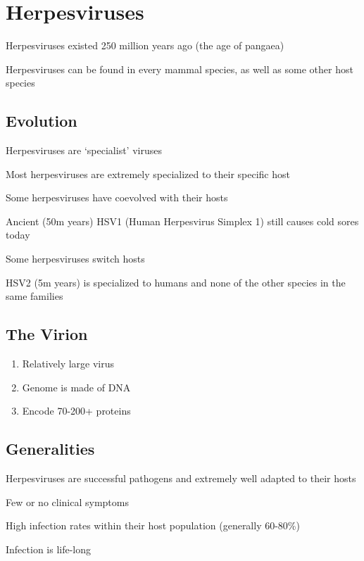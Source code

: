 \documentclass{notes}
\begin{document}
\section{Herpesviruses}

Herpesviruses existed 250 million years ago (the age of pangaea)

Herpesviruses can be found in every mammal species, as well as some other host species


\subsection{Evolution}

Herpesviruses are `specialist' viruses

\tab Most herpesviruses are extremely specialized to their specific host

Some herpesviruses have coevolved with their hosts

\tab \indicates Ancient (50m years) HSV1 (Human Herpesvirus Simplex 1) still  causes cold sores today

Some herpesviruses switch hosts

\tab \indicates HSV2 (5m years) is specialized to humans and none of the other species in the same families

\subsection{The Virion}

\begin{enumerate}
    \item Relatively large virus
    \item Genome is made of DNA
    \item Encode 70-200+ proteins
\end{enumerate}

\subsection{Generalities}

Herpesviruses are successful pathogens and extremely well adapted to their hosts

\tab Few or no clinical symptoms

\tab High infection rates within their host population (generally 60-80\%)

\tab Infection is life-long
\end{document}
